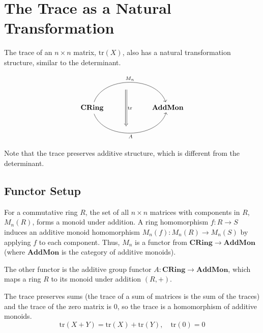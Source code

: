 \documentclass[uplatex,a4j,12pt,dvipdfmx]{jsarticle}
\begin{document}
\section{The Trace as a Natural Transformation}

The trace of an $n \times n$ matrix, $ \text{tr} (X)$, also has a natural transformation structure, similar to the determinant.

\[
	\begin{tikzcd}
		& {} \arrow[dd, "\text{tr}", Rightarrow, shift right] &                 \\
		\textbf{CRing} \arrow[rr, "M_{n}", bend left=71] \arrow[rr, "A"', bend right=71] &                                                     & \textbf{AddMon} \\
		& {}                                                  &
	\end{tikzcd}
\]

Note that the trace preserves additive structure, which is different from the determinant.

\subsection{Functor Setup}

For a commutative ring $R$, the set of all $n \times n$ matrices with components in $R$, $M_n(R)$, forms a monoid under addition.
A ring homomorphism $f: R \to S$ induces an additive monoid homomorphism $M_n(f): M_n(R) \to M_n(S)$ by applying $f$ to each component.
Thus, $M_n$ is a functor from $\mathbf{CRing} \to \mathbf{AddMon}$ (where $\mathbf{AddMon}$ is the category of additive monoids).

The other functor is the additive group functor $A: \mathbf{CRing} \to \mathbf{AddMon}$,
which maps a ring $R$ to its monoid under addition $(R, +)$.

The trace preserves sums (the trace of a sum of matrices is the sum of the traces) and the trace of the zero matrix is $0$, so
the trace is a homomorphism of additive monoids.
\[
	\text{tr}(X + Y) = \text{tr}(X) + \text{tr}(Y), \quad \text{tr}(0) = 0
\]
\end{document}
